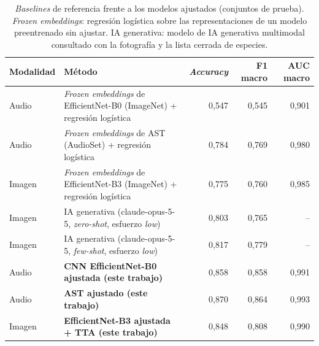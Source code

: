 \begin{table}[!htb]
  \centering\small
  \caption{\textit{Baselines} de referencia frente a los modelos ajustados (conjuntos de prueba). \textit{Frozen embeddings}: regresión logística sobre las representaciones de un modelo preentrenado sin ajustar. IA generativa: modelo de IA generativa multimodal consultado con la fotografía y la lista cerrada de especies.}
  \label{tab:baselines}
  \footnotesize
  \begin{tabularx}{\textwidth}{@{}l >{\raggedright\arraybackslash}X r r r@{}}
    \toprule
    Modalidad & Método & \textit{Accuracy} & F1 macro & AUC macro \\
    \midrule
    Audio & \textit{Frozen embeddings} de EfficientNet-B0 (ImageNet) + regresión logística & 0,547 & 0,545 & 0,901 \\
    Audio & \textit{Frozen embeddings} de AST (AudioSet) + regresión logística & 0,784 & 0,769 & 0,980 \\
    Imagen & \textit{Frozen embeddings} de EfficientNet-B3 (ImageNet) + regresión logística & 0,775 & 0,760 & 0,985 \\
    Imagen & IA generativa (claude-opus-5-5, \textit{zero-shot}, esfuerzo \textit{low}) & 0,803 & 0,765 & -- \\
    Imagen & IA generativa (claude-opus-5-5, \textit{few-shot}, esfuerzo \textit{low}) & 0,817 & 0,779 & -- \\
    \midrule
    Audio & \textbf{CNN EfficientNet-B0 ajustada (este trabajo)} & 0,858 & 0,858 & 0,991 \\
    Audio & \textbf{AST ajustado (este trabajo)} & 0,870 & 0,864 & 0,993 \\
    Imagen & \textbf{EfficientNet-B3 ajustada + TTA (este trabajo)} & 0,848 & 0,808 & 0,990 \\
    \bottomrule
  \end{tabularx}
\end{table}

